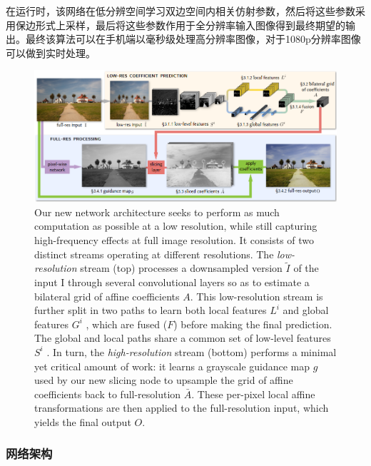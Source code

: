 \documentclass[letterpaper,12pt]{article}
\begin{document}
	在运行时，该网络在低分辨空间学习双边空间内相关仿射参数，然后将这些参数采用保边形式上采样，最后将这些参数作用于全分辨率输入图像得到最终期望的输出。最终该算法可以在手机端以毫秒级处理高分辨率图像，对于1080p分辨率图像可以做到实时处理。
	
	\begin{figure}[ht] 
		\centering
	    \includegraphics[width=0.8\columnwidth]{network_architecture_2017}
	    \captionsetup{font=scriptsize}
		\caption{
			\label{fig:network architecture 2017} %
			Our new network architecture seeks to perform as much computation as possible at a low resolution, while still capturing high-frequency effects at full image resolution. It consists of two distinct streams operating at different resolutions. The \textit{low-resolution} stream (top) processes a downsampled version $\tilde{I}$ of the input I through several convolutional layers so as to estimate a bilateral grid of affine coefficients $A$. This low-resolution stream is further split in two paths to learn both local features $L^i$ and global features $G^i$ , which are fused ($F$) before making the final prediction. The global and local paths share a common set of low-level features $S^i$ . In turn, the \textit{high-resolution} stream (bottom) performs a minimal yet critical amount of work: it learns a grayscale guidance map $g$ used by our new slicing node to upsample the grid of affine coefficients back to full-resolution $\bar{A}$. These per-pixel local affine transformations are then applied to the full-resolution input, which yields the final output $O$.}
	\end{figure}
	
		\subsubsection{网络架构}
		
\end{document}
